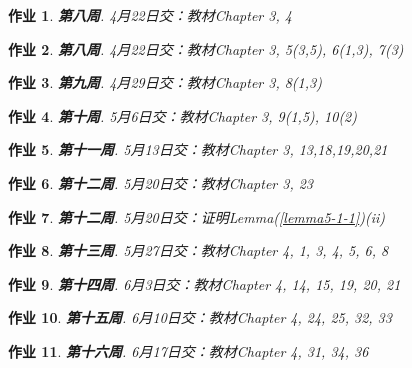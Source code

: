 \documentclass[11pt, a4paper]{article}
\theoremstyle{theorem}
\newtheorem{hw}{作业}
\begin{document}
\begin{hw} \textbf{第八周}.
4月22日交：教材Chapter 3, 4
\end{hw}

\begin{hw} \textbf{第八周}.
4月22日交：教材Chapter 3, 5(3,5), 6(1,3), 7(3)
\end{hw}

\begin{hw} \textbf{第九周}.
4月29日交：教材Chapter 3, 8(1,3)
\end{hw}

\begin{hw} \textbf{第十周}.
5月6日交：教材Chapter 3, 9(1,5), 10(2)
\end{hw}

\begin{hw} \textbf{第十一周}.
5月13日交：教材Chapter 3, 13,18,19,20,21
\end{hw}

\begin{hw} \textbf{第十二周}.
5月20日交：教材Chapter 3, 23
\end{hw}

\begin{hw} \textbf{第十二周}.
5月20日交：证明Lemma(\ref{lemma5-1-1})(ii)
\end{hw}

\begin{hw} \textbf{第十三周}.
5月27日交：教材Chapter 4, 1, 3, 4, 5, 6, 8
\end{hw}

\begin{hw} \textbf{第十四周}.
6月3日交：教材Chapter 4, 14, 15, 19, 20, 21
\end{hw}

\begin{hw} \textbf{第十五周}.
6月10日交：教材Chapter 4, 24, 25, 32, 33
\end{hw}

\begin{hw} \textbf{第十六周}.
6月17日交：教材Chapter 4, 31, 34, 36
\end{hw}
\end{document}
